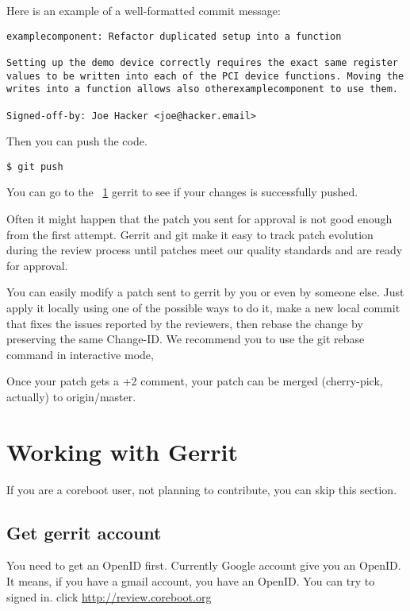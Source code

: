 \documentclass[titlepage,12pt]{article}
\begin{document}
{Here is an example of a well-formatted commit message:

{ \small
\begin{verbatim}
examplecomponent: Refactor duplicated setup into a function

Setting up the demo device correctly requires the exact same register
values to be written into each of the PCI device functions. Moving the
writes into a function allows also otherexamplecomponent to use them.

Signed-off-by: Joe Hacker <joe@hacker.email>
\end{verbatim}
}

Then you can push the code.
{ \small
\begin{verbatim}
$ git push
\end{verbatim}
}

You can go to the ~\ref{sec:gerrit} gerrit to see if your changes is successfully pushed.

Often it might happen that the patch you sent for approval is not good
enough from the first attempt. Gerrit and git make it easy to track
patch evolution during the review process until patches meet our
quality standards and are ready for approval.

You can easily modify a patch sent to gerrit by you or even by someone
else. Just apply it locally using one of the possible ways to do it,
make a new local commit that fixes the issues reported by the
reviewers, then rebase the change by preserving the same Change-ID. We
recommend you to use the git rebase command in interactive mode,

Once your patch gets a +2 comment, your patch can be merged (cherry-pick, actually) to origin/master.

%
%

\section{Working with Gerrit}
\label{sec:gerrit}
If you are a coreboot user, not planning to contribute, you can skip this section.
\subsection{Get gerrit account}
You need to get an OpenID first. Currently Google account give you an OpenID. It means, if you have a gmail account, you have an OpenID. You can try to signed in.
click \url{http://review.coreboot.org}

}
\end{document}
